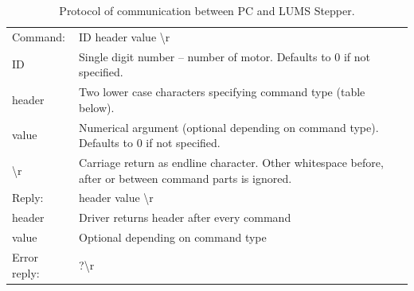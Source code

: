 \documentclass[10pt,article]{article}
\begin{document}
\begin{table}[ht]\centering
\begin{tabularx}{\textwidth}{ll}
\rowcolor[gray]{0.80} Command: & ID header value \textbackslash r \\
\rowcolor[gray]{0.95} ID & Single digit number – number of motor. Defaults to 0 if not specified.\\
\rowcolor[gray]{0.95} header & Two lower case characters specifying command type (table below).\\
\rowcolor[gray]{0.95} value & Numerical argument (optional depending on command type). Defaults to 0 if not specified. \\
\rowcolor[gray]{0.95} \textbackslash r\ & Carriage return as endline character. Other whitespace before, after or between command parts is ignored. \\
\rowcolor[gray]{0.95} 
\rowcolor[gray]{0.80} Reply: & header value \textbackslash r\\
\rowcolor[gray]{0.95} header & Driver returns header after every command \\
\rowcolor[gray]{0.95} value & Optional depending on command type\\
\rowcolor[gray]{0.80}
Error reply: & ?\textbackslash r\  \\
\end{tabularx}
\caption{Protocol of communication between PC and LUMS Stepper.}\label{protocol}
\end{table}
\end{document}
